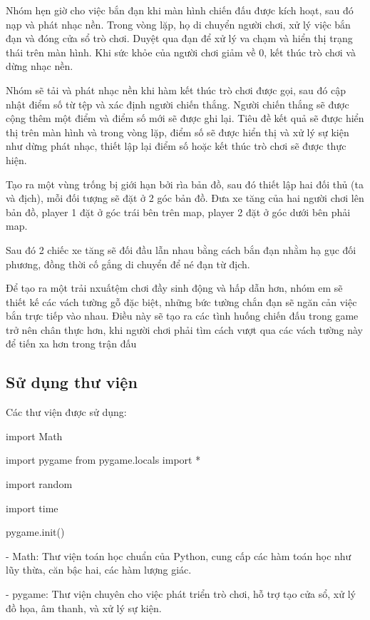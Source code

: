 \documentclass[a4paper]{article}
\begin{document}
        Nhóm hẹn giờ cho việc bắn đạn khi màn hình chiến đấu được kích hoạt, sau đó nạp và phát nhạc nền. Trong vòng lặp, họ di chuyển người chơi, xử lý việc bắn đạn và đóng cửa sổ trò chơi. Duyệt qua đạn để xử lý va chạm và hiển thị trạng thái trên màn hình. Khi sức khỏe của người chơi giảm về 0, kết thúc trò chơi và dừng nhạc nền.
        
        Nhóm sẽ tải và phát nhạc nền khi hàm kết thúc trò chơi được gọi, sau đó cập nhật điểm số từ tệp và xác định người chiến thắng. Người chiến thắng sẽ được cộng thêm một điểm và điểm số mới sẽ được ghi lại. Tiêu đề kết quả sẽ được hiển thị trên màn hình và trong vòng lặp, điểm số sẽ được hiển thị và xử lý sự kiện như dừng phát nhạc, thiết lập lại điểm số hoặc kết thúc trò chơi sẽ được thực hiện.
            
        Tạo ra một vùng trống bị giới hạn bởi rìa bản đồ, sau đó thiết lập hai đối thủ (ta và địch), mỗi đối tượng sẽ đặt ở 2 góc bản đồ. Đưa xe tăng của hai người chơi lên bản đồ, player 1 đặt ở góc trái bên trên map, player 2 đặt ở góc dưới bên phải map.

        Sau đó 2 chiếc xe tăng sẽ đối đầu lẫn nhau bằng cách bắn đạn nhằm hạ gục đối phương, đồng thời cố gắng di chuyển để né đạn từ địch.
        
        Để tạo ra một trải nxuấtệm chơi đầy sinh động và hấp dẫn hơn, nhóm em sẽ thiết kế các vách tường gỗ đặc biệt, những bức tường chắn đạn sẽ ngăn cản việc bắn trực tiếp vào nhau. Điều này sẽ tạo ra các tình huống chiến đấu trong game trở nên chân thực hơn, khi người chơi phải tìm cách vượt qua các vách tường này để tiến xa hơn trong trận đấu

	\subsection{Sử dụng thư viện}

        Các thư viện được sử dụng:

        import Math 
        
        import pygame from pygame.locals import * 
        
        import random
        
        import time
        
        pygame.init()

        - Math: Thư viện toán học chuẩn của Python, cung cấp các hàm toán học như lũy thừa, căn bậc hai, các hàm lượng giác.

        - pygame: Thư viện chuyên cho việc phát triển trò chơi, hỗ trợ tạo cửa sổ, xử lý đồ họa, âm thanh, và xử lý sự kiện.
    
\end{document}
